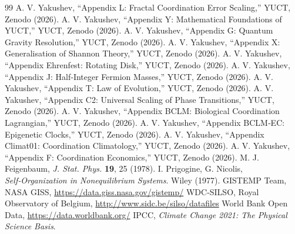 \documentclass[12pt,a4paper]{article}
\begin{document}
	\begin{thebibliography}{99}
		 A. V. Yakushev, ``Appendix L: Fractal Coordination Error Scaling,'' YUCT, Zenodo (2026).
		 A. V. Yakushev, ``Appendix Y: Mathematical Foundations of YUCT,'' YUCT, Zenodo (2026).
		 A. V. Yakushev, ``Appendix G: Quantum Gravity Resolution,'' YUCT, Zenodo (2026).
		 A. V. Yakushev, ``Appendix X: Generalisation of Shannon Theory,'' YUCT, Zenodo (2026).
		 A. V. Yakushev, ``Appendix Ehrenfest: Rotating Disk,'' YUCT, Zenodo (2026).
		 A. V. Yakushev, ``Appendix J: Half‑Integer Fermion Masses,'' YUCT, Zenodo (2026).
		 A. V. Yakushev, ``Appendix T: Law of Evolution,'' YUCT, Zenodo (2026).
		 A. V. Yakushev, ``Appendix C2: Universal Scaling of Phase Transitions,'' YUCT, Zenodo (2026).
		 A. V. Yakushev, ``Appendix BCLM: Biological Coordination Lagrangian,'' YUCT, Zenodo (2026).
		 A. V. Yakushev, ``Appendix BCLM‑EC: Epigenetic Clocks,'' YUCT, Zenodo (2026).
		 A. V. Yakushev, ``Appendix Climat01: Coordination Climatology,'' YUCT, Zenodo (2026).
		 A. V. Yakushev, ``Appendix F: Coordination Economics,'' YUCT, Zenodo (2026).
		 M. J. Feigenbaum, \emph{J. Stat. Phys.} \textbf{19}, 25 (1978).
		 I. Prigogine, G. Nicolis, \emph{Self‑Organization in Nonequilibrium Systems}. Wiley (1977).
		 GISTEMP Team, NASA GISS, \url{https://data.giss.nasa.gov/gistemp/}
		 WDC‑SILSO, Royal Observatory of Belgium, \url{http://www.sidc.be/silso/datafiles}
		 World Bank Open Data, \url{https://data.worldbank.org/}
		 IPCC, \emph{Climate Change 2021: The Physical Science Basis}.
	\end{thebibliography}
	
\end{document}
